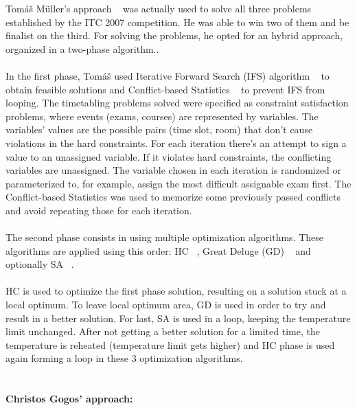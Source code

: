 Tom\'{a}\v{s} M\"{u}ller's approach ~\cite{Mueller2009} was actually used to solve all three problems established by the ITC 2007 competition. He was able to win two of them and be finalist on the third. For solving the problems, he opted for an hybrid approach, organized in a two-phase algorithm..\\
\\
In the first phase, Tom\'{a}\v{s} used Iterative Forward Search (IFS) algorithm ~\cite{Mueller2005} to obtain feasible solutions and Conflict-based Statistics ~\cite{Rudova2004} to prevent IFS from looping. The timetabling problems solved were specified as constraint satisfaction problems, where events (exams, courses) are represented by variables. The variables' values are the possible pairs (time slot, room) that don't cause violations in the hard constraints. For each iteration there's an attempt to sign a value to an unassigned variable. If it violates hard constraints, the conflicting variables are unassigned. The variable chosen in each iteration is randomized or parameterized to, for example, assign the most difficult assignable exam first. The Conflict-based Statistics was used to memorize some previously passed conflicts and avoid repeating those for each iteration.\\
\\
The second phase consists in using multiple optimization algorithms. These algorithms are applied using this order: HC ~\cite{Russell2010}, Great Deluge (GD) ~\cite{Dueck1993} and optionally SA ~\cite{Kirkpatrick1983}.\\
\\
HC is used to optimize the first phase solution, resulting on a solution stuck at a local optimum. To leave local optimum area, GD is used in order to try and result in a better solution. For last, SA is used in a loop, keeping the temperature limit unchanged. After not getting a better solution for a limited time, the temperature is reheated (temperature limit gets higher) and HC phase is used again forming a loop in these 3 optimization algorithms.\\
\\
\paragraph{Christos Gogos' approach:}

